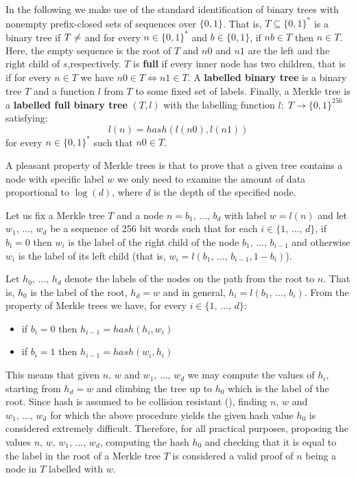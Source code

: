 \documentclass[a4paper]{article}
\begin{document}
    In the following we make use of the standard identification of binary trees with nonempty prefix-closed sets
    of sequences over $\{0,1\}$. That is, $T \subseteq \{0,1\}^*$ is a binary tree if $T \neq \empty$ and for every
    $n \in \{0,1\}^*$ and $b \in \{0,1\}$, if $nb \in T$ then $n \in T$. Here, the empty sequence is the
    root of $T$ and $n0$ and $n1$ are the left and the right child of $s$,respectively.
    $T$ is \textbf{full} if every inner node has two children, that is if for every $n \in T$ we have $n0 \in T \iff n1 \in T$.
    A \textbf{labelled binary tree} is a binary tree $T$ and a function $l$ from $T$ to some fixed set of labels.
    Finally, a Merkle tree is a \textbf{labelled full binary tree} $(T, l)$ with the labelling function
    $l:\; T \rightarrow \{0,1\}^{256}$ satisfying:
    \begin{displaymath}
        l(n) = hash(l(n0), l(n1))
    \end{displaymath}
    for every $n \in \{0,1\}^*$ such that $n0 \in T$.

    A pleasant property of Merkle trees is that to prove that a given tree contains a node with specific label $w$
    we only need to examine the amount of data proportional to $\log(d)$, where $d$ is the depth of the specified node.

    Let us fix a Merkle tree $T$ and a node $n = b_1,\,\ldots,\,b_d$ with label $w = l(n)$ and let $w_1,\,\ldots,\,w_d$
    be a sequence of 256 bit words such that for each $i \in \{1,\,\ldots,\,d\}$, if $b_i = 0$ then $w_i$ is the label
    of the right child of the node $b_1,\,\ldots,\, b_{i-1}$ and otherwise $w_i$ is the label of its left child
    (that is, $w_i = l(b_1, \,\ldots,\,b_{i-1}, 1 - b_i)$).

    Let $h_0,\,\ldots,\, h_d$ denote the labels of the nodes on the path from the root to $n$. That is, $h_0$ is
    the label of the root, $h_d = w$ and in general, $h_i = l(b_1,\,\ldots,\,b_i)$. From the property of Merkle trees
    we have, for every $i \in \{1,\,\ldots,\,d\}$:
    \begin{itemize}
        \item if $b_i = 0$ then $h_{i-1} = hash(h_i, w_i)$
        \item if $b_i = 1$ then $h_{i-1} = hash(w_i, h_i)$
    \end{itemize}
    This means that given $n,\, w$ and $w_1,\,\ldots,\,w_d$ we may compute the values of $h_i$, starting from $h_d = w$
    and climbing the tree up to $h_0$ which is the label of the root. Since hash is assumed to be collision resistant
    (\cite{SHA3}), finding $n$, $w$ and $w_1,\,\ldots,\,w_d$ for which the above procedure yields the given
    hash value $h_0$ is considered extremely difficult. Therefore, for all practical purposes, proposing the values
    $n,\,w,\,w_1,\,\ldots,\,w_d$, computing the hash $h_0$ and checking that it is equal to the label in the root of
    a Merkle tree $T$ is considered a valid proof of $n$ being a node in $T$ labelled with $w$.
\end{document}
